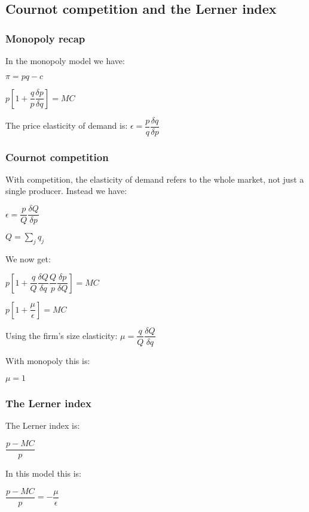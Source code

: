 
\subsection{Cournot competition and the Lerner index}


\subsubsection{Monopoly recap}

In the monopoly model we have:

\(\pi = pq-c\)

\(p[1+\dfrac{q}{p}\dfrac{\delta p}{\delta q}]=MC\)

The price elasticity of demand is: \(\epsilon = \dfrac{p}{q}\dfrac{\delta q}{\delta p}\)

\subsubsection{Cournot competition}

With competition, the elasticity of demand refers to the whole market, not just a single producer. Instead we have:

\(\epsilon = \dfrac{p}{Q}\dfrac{\delta Q}{\delta p}\)

\(Q=\sum_j q_j\)

We now get:

\(p[1+\dfrac{q}{Q}\dfrac{\delta Q}{\delta q}\dfrac{Q}{p}\dfrac{\delta p}{\delta Q}]=MC\)

\(p[1+\dfrac{\mu }{\epsilon }]=MC\)

Using the firm's size elasticity: \(\mu = \dfrac{q}{Q}\dfrac{\delta Q}{\delta q}\)

With monopoly this is:

\(\mu = 1\)

\subsubsection{The Lerner index}

The Lerner index is:

\(\dfrac{p-MC}{p}\)

In this model this is:

\(\dfrac{p-MC}{p}=-\dfrac{\mu}{\epsilon }\)

